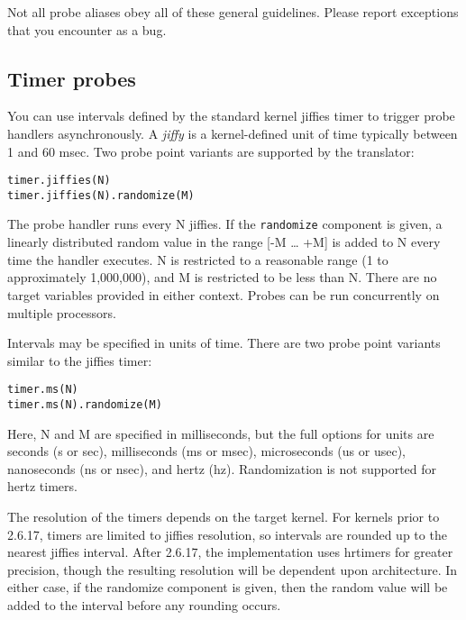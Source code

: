 \documentclass[twoside,english]{article}
\newenvironment{vindent}
{\begin{list}{}{\setlength{\listparindent}{6pt}}
\item[]}
{\end{list}}
\begin{document}
Not all probe aliases obey all of these general guidelines.  Please
report exceptions that you encounter as a bug.


\subsection{Timer probes}
You can use intervals defined by the standard kernel jiffies
timer to trigger probe handlers asynchronously. A \emph{jiffy} is a kernel-defined
unit of time typically between 1 and 60 msec. Two probe point variants are
supported by the translator:

\begin{vindent}
\begin{verbatim}
timer.jiffies(N)
timer.jiffies(N).randomize(M)
\end{verbatim}
\end{vindent}
The probe handler runs every N jiffies. If the \texttt{randomize}
component is given, a linearly distributed random value in the range {[}-M
\ldots{} +M] is added to N every time the handler executes. N is restricted
to a reasonable range (1 to approximately 1,000,000), and M is restricted
to be less than N. There are no target variables provided in either context.
Probes can be run concurrently on multiple processors.

Intervals may be specified in units of time. There are two probe point variants
similar to the jiffies timer:

\begin{vindent}
\begin{verbatim}
timer.ms(N)
timer.ms(N).randomize(M)
\end{verbatim}
\end{vindent}
Here, N and M are specified in milliseconds, but the
full options for units are seconds (s or sec), milliseconds (ms or msec),
microseconds (us or usec), nanoseconds (ns or nsec), and hertz (hz). Randomization
is not supported for hertz timers.

The resolution of the timers depends on the target kernel. For kernels prior
to 2.6.17, timers are limited to jiffies resolution, so intervals are rounded
up to the nearest jiffies interval. After 2.6.17, the implementation uses
hrtimers for greater precision, though the resulting resolution will be dependent
upon architecture. In either case, if the randomize component is given, then
the random value will be added to the interval before any rounding occurs.
\end{document}
